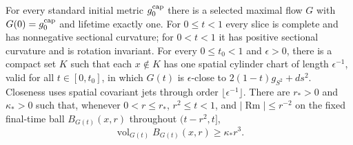 \begin{theorem}
\label{thm:standard-cap-existence}
For every standard initial metric $g_0^{\rm cap}$ there is a selected maximal
flow $G$ with $G(0)=g_0^{\rm cap}$ and lifetime exactly one.  For
$0\leq t<1$ every slice is complete and has nonnegative sectional curvature;
for $0<t<1$ it has positive sectional curvature and is rotation invariant.
For every $0\leq t_0<1$ and $\epsilon>0$, there is a compact set $K$ such
that each $x\notin K$ has one spatial cylinder chart of length
$\epsilon^{-1}$, valid for all $t\in[0,t_0]$, in which $G(t)$ is
$\epsilon$-close to $2(1-t)g_{S^2}+ds^2$.  Closeness uses spatial
covariant jets through order $\lfloor\epsilon^{-1}\rfloor$.
There are $r_*>0$ and $\kappa_*>0$ such that, whenever
$0<r\leq r_*$, $r^2\leq t<1$, and $|\operatorname{Rm}|\leq r^{-2}$
on the fixed final-time ball $B_{G(t)}(x,r)$ throughout $(t-r^2,t]$,
\[
 \operatorname{vol}_{G(t)} B_{G(t)}(x,r)\geq\kappa_*r^3.
\]
\cite[Theorem 12.5, pp. 295--297; Proposition 12.13, pp. 305--306;
Theorems 12.28--12.29 and Claim 12.30, pp. 323--325]{MT2007}
\end{theorem}

